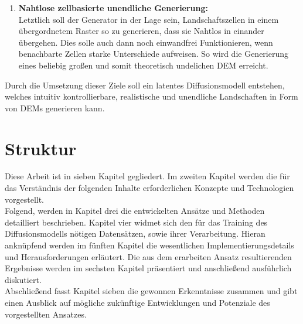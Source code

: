 \begin{enumerate}
    \item \textbf {Nahtlose zellbasierte unendliche Generierung:} \\
    Letztlich soll der Generator in der Lage sein, Landschaftszellen in einem übergordnetem Raster so zu generieren, dass sie Nahtlos in einander übergehen. Dies solle auch dann noch einwandfrei Funktionieren, wenn benachbarte Zellen starke Unterschiede aufweisen. So wird die Generierung eines beliebig großen und somit theoretisch undelichen \ac{DEM} erreicht.
     
\end{enumerate}

Durch die Umsetzung dieser Ziele soll ein latentes Diffusionsmodell entstehen, welches intuitiv kontrollierbare, realistische und unendliche Landschaften in Form von \ac{DEM}s generieren kann.

\section{Struktur}

Diese Arbeit ist in sieben Kapitel gegliedert. Im zweiten Kapitel werden die für das Verständnis der folgenden Inhalte erforderlichen Konzepte und Technologien vorgestellt. \\
Folgend, werden in Kapitel drei die entwickelten Ansätze und Methoden detailliert beschrieben. Kapitel vier widmet sich den für das Training des Diffusionsmodells nötigen Datensätzen, sowie ihrer Verarbeitung. Hieran anknüpfend werden im fünften Kapitel die wesentlichen Implementierungsdetails und Herausforderungen erläutert. Die aus dem erarbeiten Ansatz resultierenden Ergebnisse werden im sechsten Kapitel präsentiert und anschließend ausführlich diskutiert. \\
Abschließend fasst Kapitel sieben die gewonnen Erkenntnisse zusammen und gibt einen Ausblick auf mögliche zukünftige Entwicklungen und Potenziale des vorgestellten Ansatzes.